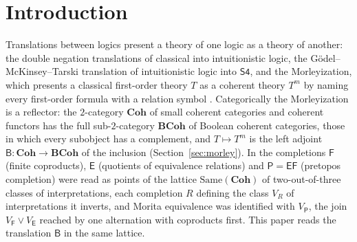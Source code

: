 \documentclass[11pt]{amsart}
\theoremstyle{definition}
\newcommand{\Same}{\mathrm{Same}}
\newcommand{\Coh}{\mathbf{Coh}}
\newcommand{\BCoh}{\mathbf{BCoh}}
\newcommand{\FF}{\mathsf F}
\newcommand{\EE}{\mathsf E}
\newcommand{\PP}{\mathsf P}
\newcommand{\BB}{\mathsf B}
\begin{document}
\section{Introduction}\label{sec:intro}

Translations between logics present a theory of one logic as a theory
of another: the double negation translations of classical into
intuitionistic logic, the G\"odel--McKinsey--Tarski translation of
intuitionistic logic into $\mathsf{S4}$, and the Morleyization, which
presents a classical first-order theory $T$ as a coherent theory $T^m$
by naming every first-order formula with a relation symbol
\cite[D1.5.13]{Elephant}. Categorically the Morleyization is a
reflector: the $2$-category $\Coh$ of small coherent categories and
coherent functors has the full sub-$2$-category $\BCoh$ of Boolean
coherent categories, those in which every subobject has a complement,
and $T\mapsto T^m$ is the left adjoint $\BB\colon\Coh\to\BCoh$ of the
inclusion (Section~\ref{sec:morley}). In \cite{TheoryComp} the
completions $\FF$ (finite coproducts), $\EE$ (quotients of equivalence
relations) and $\PP=\EE\FF$ (pretopos completion) were read as points of
the lattice $\Same(\Coh)$ of two-out-of-three classes of interpretations,
each completion $R$ defining the class $V_R$ of interpretations it
inverts, and Morita equivalence \cite{BH16,Tsem17} was identified with
$V_\PP$, the join $V_\FF\vee V_\EE$ reached by one alternation with
coproducts first. This paper reads the translation $\BB$ in the same
lattice.
\end{document}
